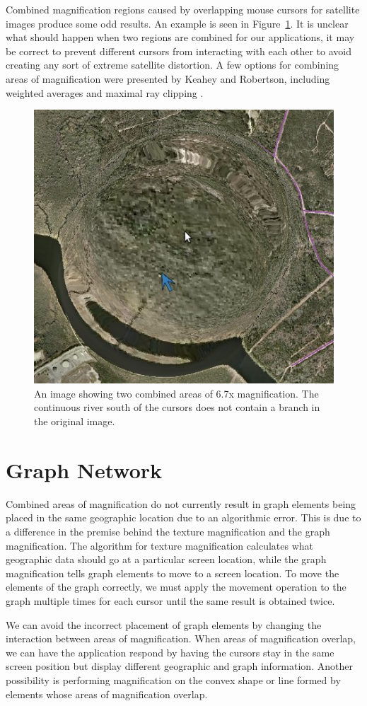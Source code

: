 Combined magnification regions caused by overlapping mouse cursors for satellite images produce some odd results. An example is seen in Figure~\ref{fig:distortion_clipped}. It is unclear what should happen when two regions are combined for our applications, it may be correct to prevent different cursors from interacting with each other to avoid creating any sort of extreme satellite distortion. A few options for combining areas of magnification were presented by Keahey and Robertson, including weighted
averages and maximal ray clipping \cite{Keahey1996}.

\begin{figure} \centering
    \includegraphics[width=0.50\linewidth]{img/added_distortion_clip.jpg}
    \caption[Combined Satellite Distortion]{An image showing two combined areas of 6.7x magnification. The continuous river south of the cursors does not contain a branch in the original image.}
    \label{fig:distortion_clipped}
\end{figure}

\section{Graph Network}
\label{section:future_graph_network}

Combined areas of magnification do not currently result in graph elements being placed in the same geographic location due to an algorithmic error. This is due to a difference in the premise behind the texture magnification and the graph magnification. The algorithm for texture magnification calculates what geographic data should go at a particular screen location, while the graph magnification tells graph elements to move to a screen location. To move the elements of the graph correctly, we must apply the movement operation to the graph multiple times for each cursor until the same result is obtained twice. 

We can avoid the incorrect placement of graph elements by changing the interaction between areas of magnification. When areas of magnification overlap, we can have the application respond by having the cursors stay in the same screen position but display different geographic and graph information. Another possibility is performing magnification on the convex shape or line formed by elements whose areas of magnification overlap.

